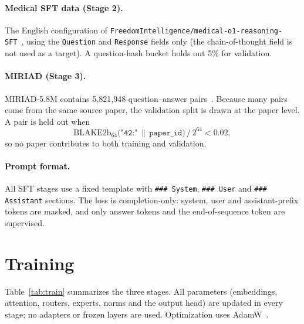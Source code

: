 \documentclass[11pt,a4paper]{article}
\begin{document}
\paragraph{Medical SFT data (Stage 2).} The English configuration of \nolinkurl{FreedomIntelligence/medical-o1-reasoning-SFT}~\citep{chen2025huatuogpto1}, using the \texttt{Question} and \texttt{Response} fields only (the chain-of-thought field is not used as a target). A question-hash bucket holds out 5\% for validation.

\paragraph{MIRIAD (Stage 3).} MIRIAD-5.8M contains 5,821,948 question--answer pairs~\citep{zheng2025miriad}. Because many pairs come from the same source paper, the validation split is drawn at the paper level. A pair is held out when
\[ \mathrm{BLAKE2b}_{64}\big(\texttt{"42:"} \,\|\, \texttt{paper\_id}\big) \,/\, 2^{64} < 0.02, \]
so no paper contributes to both training and validation.

\paragraph{Prompt format.} All SFT stages use a fixed template with \texttt{\#\#\# System}, \texttt{\#\#\# User} and \texttt{\#\#\# Assistant} sections. The loss is completion-only: system, user and assistant-prefix tokens are masked, and only answer tokens and the end-of-sequence token are supervised.

\section{Training}

Table~\ref{tab:train} summarizes the three stages. All parameters (embeddings, attention, routers, experts, norms and the output head) are updated in every stage; no adapters or frozen layers are used. Optimization uses AdamW~\citep{loshchilov2019adamw}.
\end{document}
